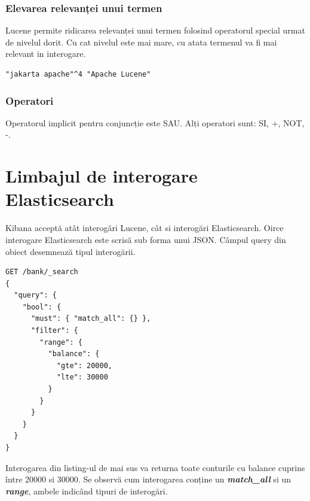 \documentclass[a4paper, 12pt, twoside]{report}
\begin{document}
	\subsubsection{Elevarea relevanței unui termen}
Lucene permite ridicarea relevanței unui termen folosind operatorul special urmat de nivelul dorit. Cu cat nivelul este mai mare, cu atata termenul va fi mai relevant in interogare.
\begin{lstlisting}[caption={elevarea relevanței - Lucene query},captionpos=b]
"jakarta apache"^4 "Apache Lucene"
\end{lstlisting}

	\subsubsection{Operatori}
Operatorul implicit pentru conjuncție este SAU. Alți operatori sunt: SI, +, NOT, -.

	\section{Limbajul de interogare Elasticsearch}

Kibana acceptă atât interogări Lucene, cât si interogări Elasticsearch. Oirce interogare Elasticsearch este scrisă sub forma unui JSON. Câmpul query din obiect desemnează tipul interogării.
 
\begin{lstlisting}[caption={exemplu interogare Elasticsearch - JSON},captionpos=b]
GET /bank/_search
{
  "query": {
    "bool": {
      "must": { "match_all": {} },
      "filter": {
        "range": {
          "balance": {
            "gte": 20000,
            "lte": 30000
          }
        }
      }
    }
  }
}
\end{lstlisting}

Interogarea din listing-ul de mai sus va returna toate conturile cu balance cuprins între 20000 si 30000. Se observă cum interogarea conține un {\textbf{\textit{match\_all}}} si un \textbf{\textit{range}}, ambele indicând tipuri de interogări.
\end{document}
